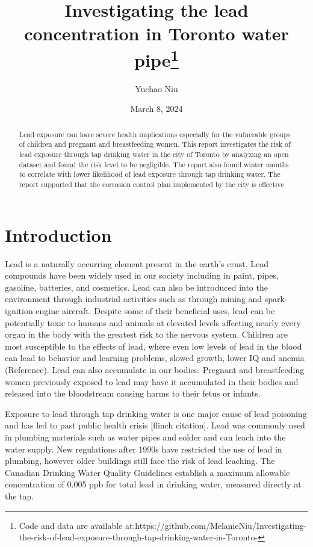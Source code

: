 \documentclass[
  letterpaper,
  DIV=11,
  numbers=noendperiod]{scrartcl}
\title{Investigating the lead concentration in Toronto water
pipe\thanks{Code and data are available
at:https://github.com/MelanieNiu/Investigating-the-risk-of-lead-exposure-through-tap-drinking-water-in-Toronto-}}
\author{Yuchao Niu}
\date{March 8, 2024}
\begin{document}
\maketitle
\begin{abstract}
Lead exposure can have severe health implications especially for the
vulnerable groups of children and pregnant and breastfeeding women. This
report investigates the risk of lead exposure through tap drinking water
in the city of Toronto by analyzing an open dataset and found the risk
level to be negligible. The report also found winter months to correlate
with lower likelihood of lead exposure through tap drinking water. The
report supported that the corrosion control plan implemented by the city
is effective.
\end{abstract}
\ifdefined\Shaded\renewenvironment{Shaded}{\begin{tcolorbox}[interior hidden, borderline west={3pt}{0pt}{shadecolor}, frame hidden, boxrule=0pt, breakable, sharp corners, enhanced]}{\end{tcolorbox}}\fi

\hypertarget{introduction}{%
\section{Introduction}\label{introduction}}

Lead is a naturally occurring element present in the earth's crust. Lead
compounds have been widely used in our society including in paint,
pipes, gasoline, batteries, and cosmetics. Lead can also be introduced
into the environment through industrial activities such as through
mining and spark-ignition engine aircraft. Despite some of their
beneficial uses, lead can be potentially toxic to humans and animals at
elevated levels affecting nearly every organ in the body with the
greatest risk to the nervous system. Children are most susceptible to
the effects of lead, where even low levels of lead in the blood can lead
to behavior and learning problems, slowed growth, lower IQ and anemia
(Reference). Lead can also accumulate in our bodies. Pregnant and
breastfeeding women previously exposed to lead may have it accumulated
in their bodies and released into the bloodstream causing harms to their
fetus or infants.

Exposure to lead through tap drinking water is one major cause of lead
poisoning and has led to past public health crisis {[}flinch
citation{]}. Lead was commonly used in plumbing materials such as water
pipes and solder and can leach into the water supply. New regulations
after 1990s have restricted the use of lead in plumbing, however older
buildings still face the risk of lead leaching. The Canadian Drinking
Water Quality Guidelines establish a maximum allowable concentration of
0.005 ppb for total lead in drinking water, measured directly at the
tap.
\end{document}
